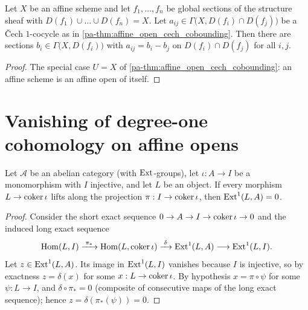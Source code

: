 \begin{theorem}
  \label{pa-thm:cech_cobounding}
  \leanok

  Let \(X\) be an affine scheme and let \(f_1, \dots, f_n\) be global sections of the
  structure sheaf with \(D(f_1) \cup \dots \cup D(f_n) = X\). Let
  \(a_{ij} \in \Gamma\bigl(X, D(f_i) \cap D(f_j)\bigr)\) be a \v{C}ech \(1\)-cocycle as in
  \ref{pa-thm:affine_open_cech_cobounding}. Then there are sections
  \(b_i \in \Gamma\bigl(X, D(f_i)\bigr)\) with \(a_{ij} = b_i - b_j\) on
  \(D(f_i) \cap D(f_j)\) for all \(i, j\).
\end{theorem}
\begin{proof}
  \leanok
  The special case \(U = X\) of \ref{pa-thm:affine_open_cech_cobounding}: an affine scheme is
  an affine open of itself.
\end{proof}

\section{Vanishing of degree-one cohomology on affine opens}

\begin{lemma}
  \label{pa-lem:ext_one_vanishing_criterion}
  \leanok

  Let \(\mathcal A\) be an abelian category (with \(\operatorname{Ext}\)-groups), let
  \(\iota : A \to I\) be a monomorphism with \(I\) injective, and let \(L\) be an object. If
  every morphism \(L \to \operatorname{coker} \iota\) lifts along the projection
  \(\pi : I \to \operatorname{coker} \iota\), then \(\operatorname{Ext}^1(L, A) = 0\).
\end{lemma}
\begin{proof}
  \leanok
  Consider the short exact sequence \(0 \to A \to I \to \operatorname{coker} \iota \to 0\) and the induced
  long exact sequence
  \[
    \operatorname{Hom}(L, I) \xrightarrow{\;\pi_*\;} \operatorname{Hom}(L, \operatorname{coker} \iota)
      \xrightarrow{\;\delta\;} \operatorname{Ext}^1(L, A) \longrightarrow \operatorname{Ext}^1(L, I).
  \]
  Let \(z \in \operatorname{Ext}^1(L, A)\). Its image in \(\operatorname{Ext}^1(L, I)\) vanishes because \(I\) is
  injective, so by exactness \(z = \delta(x)\) for some \(x : L \to \operatorname{coker} \iota\). By
  hypothesis \(x = \pi \circ \psi\) for some \(\psi : L \to I\), and
  \(\delta \circ \pi_* = 0\) (composite of consecutive maps of the long exact sequence);
  hence \(z = \delta(\pi_*(\psi)) = 0\).
\end{proof}

